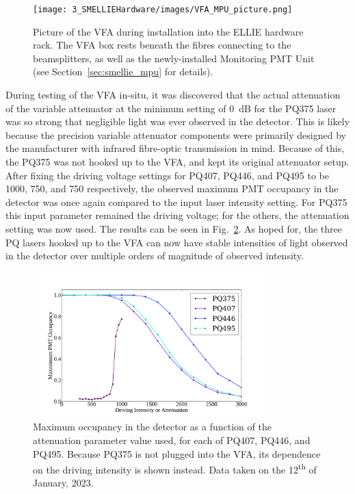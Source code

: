 \begin{figure}
    \centering
    \texttt{[image: 3\_SMELLIEHardware/images/VFA\_MPU\_picture.png]}
    \caption[Picture of the VFA during installation into the ELLIE hardware rack]
    {Picture of the VFA during installation into the ELLIE hardware rack. The VFA box rests beneath the fibres connecting to the beamsplitters, as well as the newly-installed Monitoring PMT Unit (see Section~\ref{sec:smellie_mpu} for details).}
    \label{fig:vfa_picture}
\end{figure}

During testing of the VFA in-situ, it was discovered that the actual attenuation of the variable attenuator at the minimum setting of \SI{0}{\dB} for the PQ375 laser was so strong that negligible light was ever observed in the detector. This is likely because the precision variable attenuator components were primarily designed by the manufacturer with infrared fibre-optic transmission in mind. Because of this, the PQ375 was not hooked up to the VFA, and kept its original attenuator setup. After fixing the driving voltage settings for PQ407, PQ446, and PQ495 to be 1000, 750, and 750 respectively, %
the observed maximum PMT occupancy in the detector was once again compared to the input laser intensity setting. For PQ375 this input parameter remained the driving voltage; for the others, the attenuation setting was now used. The results can be seen in Fig.~\ref{fig:pq_new_intensity_dependence}. As hoped for, the three PQ lasers hooked up to the VFA can now have stable intensities of light observed in the detector over multiple orders of magnitude of observed intensity.

\begin{figure}
    \centering
    \includegraphics[width=0.8\textwidth]{3_SMELLIEHardware/images/smellie_intensity_scan_new.pdf}
    \caption[Maximum occupancy in the detector as a function of the attenuation parameter value used]
    {Maximum occupancy in the detector as a function of the attenuation parameter value used, for each of PQ407, PQ446, and PQ495. Because PQ375 is not plugged into the VFA, its dependence on the driving intensity is shown instead. Data taken on the 12\textsuperscript{th} of January, 2023.}
    \label{fig:pq_new_intensity_dependence}
\end{figure}

